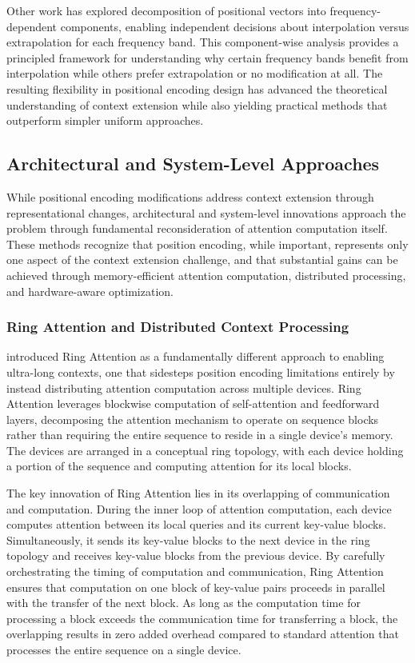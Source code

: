 \documentclass[11pt,letterpaper]{article}
\begin{document}
Other work has explored decomposition of positional vectors into frequency-dependent components, enabling independent decisions about interpolation versus extrapolation for each frequency band. This component-wise analysis provides a principled framework for understanding why certain frequency bands benefit from interpolation while others prefer extrapolation or no modification at all. The resulting flexibility in positional encoding design has advanced the theoretical understanding of context extension while also yielding practical methods that outperform simpler uniform approaches.

\subsection{Architectural and System-Level Approaches}

While positional encoding modifications address context extension through representational changes, architectural and system-level innovations approach the problem through fundamental reconsideration of attention computation itself. These methods recognize that position encoding, while important, represents only one aspect of the context extension challenge, and that substantial gains can be achieved through memory-efficient attention computation, distributed processing, and hardware-aware optimization.

\subsubsection{Ring Attention and Distributed Context Processing}

\cite{liu2023ring} introduced Ring Attention as a fundamentally different approach to enabling ultra-long contexts, one that sidesteps position encoding limitations entirely by instead distributing attention computation across multiple devices. Ring Attention leverages blockwise computation of self-attention and feedforward layers, decomposing the attention mechanism to operate on sequence blocks rather than requiring the entire sequence to reside in a single device's memory. The devices are arranged in a conceptual ring topology, with each device holding a portion of the sequence and computing attention for its local blocks.

The key innovation of Ring Attention lies in its overlapping of communication and computation. During the inner loop of attention computation, each device computes attention between its local queries and its current key-value blocks. Simultaneously, it sends its key-value blocks to the next device in the ring topology and receives key-value blocks from the previous device. By carefully orchestrating the timing of computation and communication, Ring Attention ensures that computation on one block of key-value pairs proceeds in parallel with the transfer of the next block. As long as the computation time for processing a block exceeds the communication time for transferring a block, the overlapping results in zero added overhead compared to standard attention that processes the entire sequence on a single device.
\end{document}

